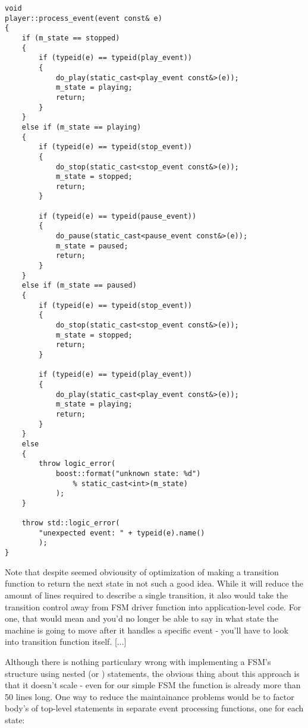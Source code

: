 \documentclass{netobjectdays}
\begin{document}
{\footnotesize
\begin{verbatim}
void
player::process_event(event const& e)
{
    if (m_state == stopped)
    {
        if (typeid(e) == typeid(play_event))
        {
            do_play(static_cast<play_event const&>(e));
            m_state = playing;
            return;
        }
    }
    else if (m_state == playing)
    {
        if (typeid(e) == typeid(stop_event))
        {
            do_stop(static_cast<stop_event const&>(e));
            m_state = stopped;
            return;
        }

        if (typeid(e) == typeid(pause_event))
        {
            do_pause(static_cast<pause_event const&>(e));
            m_state = paused;
            return;
        }
    }
    else if (m_state == paused)
    {
        if (typeid(e) == typeid(stop_event))
        {
            do_stop(static_cast<stop_event const&>(e));
            m_state = stopped;
            return;
        }

        if (typeid(e) == typeid(play_event))
        {
            do_play(static_cast<play_event const&>(e));
            m_state = playing;
            return;
        }
    }
    else
    {
        throw logic_error(
            boost::format("unknown state: %d")
                % static_cast<int>(m_state)
            );
    }

    throw std::logic_error(
        "unexpected event: " + typeid(e).name()
        );
}
\end{verbatim}
}

Note that despite seemed obviousity of optimization of making 
a transition function to return the next state in not such a 
good idea. While it will reduce the amount of lines required 
to describe a single transition, it also would take the 
transition control away from FSM driver function into 
application-level code. For one, that would mean and you'd no 
longer be able to say in what state the machine is going to 
move after it handles a specific event - you'll have to look 
into transition function itself. [...] 

Although there is nothing particulary wrong with implementing 
a FSM's structure using nested  (or )
statements, the obvious thing about this approach is that it 
doesn't scale - even for our simple FSM the 
 function is already more than 50 lines
long. One way to reduce the maintainance problems would be to 
factor body's of top-level  statements in separate 
event processing functions, one for each state:
\end{document}
